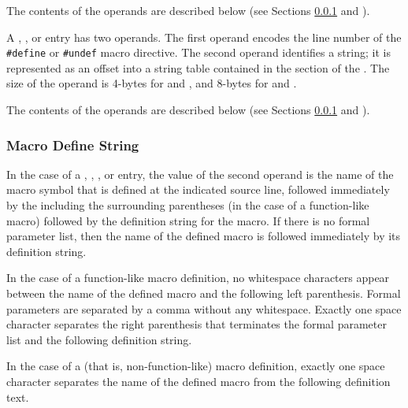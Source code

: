 \begin{enumerate}[1. ]
The contents of the operands are described below (see Sections 
\ref{chap:macrodefinestring} and ).

\itembfnl{\bb \DWMACROdefinesupfourTARG{}, \DWMACROdefinesupeightTARG{},
\DWMACROundefsupfourTARG{}, \DWMACROundefsupeightTARG
\eb}
\bb
A \DWMACROdefinesupfourNAME{}, \DWMACROdefinesupeightNAME{}, 
\DWMACROundefsupfourNAME{} or \DWMACROundefsupeightNAME{}
\eb
entry has two operands.  The first operand encodes the line number 
of the \texttt{\#define} or \texttt{\#undef} macro directive.
The second operand identifies a string; it is represented as
an offset into a string table contained in the \dotdebugstr{} 
section of the .  
The size of the operand 
\bb
is 4-bytes for \DWMACROdefinesupfourNAME{} and \DWMACROundefsupfourNAME, and
8-bytes for \DWMACROdefinesupeightNAME{} and \DWMACROundefsupeightNAME.
\eb  

The contents of the operands are described below (see Sections 
\ref{chap:macrodefinestring} and ).

\end{enumerate}

\subsubsection{Macro Define String}
\label{chap:macrodefinestring}
In the case of a 
\DWMACROdefine{},
\DWMACROdefinestrp{},
\bb
\DWMACROdefinestrx{},
\DWMACROdefinesupfour{} or
\DWMACROdefinesupeight{}
\eb
entry, the value of the
second operand is the name of the macro symbol that is defined
at the indicated source line, followed immediately by the 
including the surrounding parentheses (in
the case of a function-like macro) followed by the definition
string for the macro. If there is no formal parameter list,
then the name of the defined macro is followed immediately by
its definition string.

In the case of a function-like macro definition, no whitespace
characters appear between the name of the defined
macro and the following left parenthesis. Formal parameters
are separated by a comma without any whitespace.
Exactly one space
character separates the right parenthesis that terminates
the formal parameter list and the following definition string.

In the case of a  (that is, non-function-like) macro
definition, exactly one space character separates the
name of the defined macro from the following definition text.

